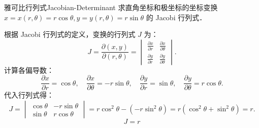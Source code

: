 \begin{problem}{雅可比行列式}{Jacobian-Determinant}
    求直角坐标和极坐标的坐标变换 $x = x(r, \theta) = r \cos \theta, y = y(r, \theta) = r \sin \theta$ 的 Jacobi 行列式．
\end{problem}

\begin{solution}
    根据 Jacobi 行列式的定义，变换的行列式 $J$ 为：
    \begin{equation}
        J = \frac{\partial(x, y)}{\partial(r, \theta)} = \begin{vmatrix}
            \frac{\partial x}{\partial r} & \frac{\partial x}{\partial \theta} \\
            \frac{\partial y}{\partial r} & \frac{\partial y}{\partial \theta}
        \end{vmatrix}.
    \end{equation}
    计算各偏导数：
    \begin{equation}
        \frac{\partial x}{\partial r} = \cos \theta, \quad \frac{\partial x}{\partial \theta} = -r \sin \theta, \quad \frac{\partial y}{\partial r} = \sin \theta, \quad \frac{\partial y}{\partial \theta} = r \cos \theta.
    \end{equation}
    代入行列式得：
    \begin{equation}
        J = \begin{vmatrix}
            \cos \theta & -r \sin \theta \\
            \sin \theta & r \cos \theta
        \end{vmatrix} = r \cos^2 \theta - (-r \sin^2 \theta) = r(\cos^2 \theta + \sin^2 \theta) = r.
    \end{equation}
    \begin{equation}
        \boxed{J = r}
    \end{equation}
\end{solution}

\endinput
